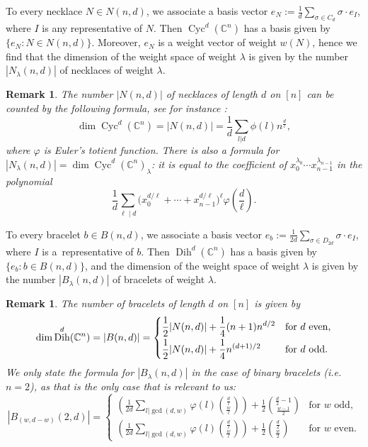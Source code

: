 \documentclass[10pt,a4paper]{amsart}
\numberwithin{equation}{section}
\newtheorem{Remark}[Theorem]{Remark}
\newcommand{\CC}{\mathbb{C}}
\DeclareMathOperator{\Cyc}{Cyc}
\DeclareMathOperator{\Dih}{Dih}
\begin{document}
 To every necklace $N\in N(n,d)$, we associate a basis vector $e_N := \frac{1}{d}\sum_{\sigma \in C_d}{\sigma \cdot e_I}$, where $I$ is any representative of $N$. Then $\Cyc^d(\CC^n)$ has a basis given by $\{e_N\colon N\in N(n,d)\}$.
 Moreover, $e_N$ is a weight vector of weight $w(N)$, hence we find that the dimension of the weight space of weight $\lambda$ is given by the number $|N_{\lambda}(n,d)|$ of necklaces of weight $\lambda$.

 \begin{Remark}
 The number $|N(n,d)|$ of necklaces of length $d$ on $[n]$ can be counted by the following formula, see for instance \cite[Theorem~7.10]{Stanley}:
 \begin{equation}\label{dimCyc}
        \dim \Cyc^d({\mathbb C}^n)= |N(n,d)|= \frac{1}{d}\sum_{l|d}\phi(l)n^{\frac{d}{l}},
 \end{equation}
 where $\varphi$ is Euler's totient function.
 There is also a formula for $|N_{\lambda}(n,d)| =\dim \Cyc^d({\mathbb C}^n)_{\lambda}$: it is equal to the coefficient of    $x_0^{\lambda_0} \cdots x_{n-1}^{\lambda_{n-1}}$ in the polynomial
\begin{equation}\label{dimCyc2}
\frac{1}{d}\sum_{\ell \mid d}{\big(x_0^{d/\ell}+\cdots+x_{n-1}^{d/\ell}\big)^{\ell}}\varphi\left(\frac{d}{\ell}\right).
\end{equation}
 \end{Remark}
  To every bracelet $b\in B(n,d)$, we associate a basis vector $e_b := \frac{1}{2d}\sum_{\sigma \in D_{2d}}{\sigma \cdot e_I}$, where $I$ is a~representative of $b$. Then $\Dih^d(\CC^n)$ has a basis given by $\{e_b\colon b\in B(n,d)\}$,
  and the dimension of the weight space of weight $\lambda$ is given by the number $|B_{\lambda}(n,d)|$ of bracelets of weight $\lambda$.
  \begin{Remark}
  The number of bracelets of length $d$ on $[n]$ is given by
  \begin{equation}\label{dimDih}
        \dim \Dih^d({\mathbb C}^n)= |B(n,d)|= \begin{cases}
               \displaystyle \frac{1}{2}|N(n,d)| + \frac{1}{4}(n+1)n^{d/2} & \text{for } d \text{ even,}\vspace{1mm}\\
              \displaystyle  \frac{1}{2}|N(n,d)| + \frac{1}{4}n^{(d+1)/2} & \text{for } d \text{ odd.}
        \end{cases}
 \end{equation}
  We only state the formula for $|B_{\lambda}(n,d)|$ in the case of binary bracelets (i.e.\ $n=2$), as that is the only case that is relevant to us:
 \begin{equation}\label{dimDih2}
|B_{(w,d-w)}(2,d)|=\begin{cases}
\displaystyle \left(\frac{1}{2d}\sum_{l \vert \gcd(d,w)}{\varphi(l)\binom{\frac{d}{l}}{\frac{w}{l}}}\right) + \frac{1}{2}\binom{\frac{d}{2}-1}{\frac{w-1}{2}} & \text{for $w$ odd,} \\
\displaystyle \left(\frac{1}{2d}\sum_{l \vert \gcd(d,w)}{\varphi(l)\binom{\frac{d}{l}}{\frac{w}{l}}}\right) + \frac{1}{2}\binom{\frac{d}{2}}{\frac{w}{2}} & \text{for $w$ even.}
\end{cases}
\end{equation}
\end{Remark}
\end{document}
